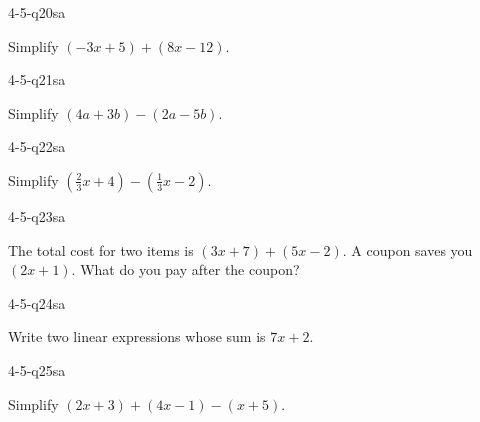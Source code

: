 \begin{practiceQuestion}{4-5-q20}{sa}
\begin{questionText}
Simplify $(-3x + 5) + (8x - 12)$.
\end{questionText}
\end{practiceQuestion}

\begin{practiceQuestion}{4-5-q21}{sa}
\begin{questionText}
Simplify $(4a + 3b) - (2a - 5b)$.
\end{questionText}
\end{practiceQuestion}

\begin{practiceQuestion}{4-5-q22}{sa}
\begin{questionText}
Simplify $(\frac{2}{3}x + 4) - (\frac{1}{3}x - 2)$.
\end{questionText}
\end{practiceQuestion}

\begin{practiceQuestion}{4-5-q23}{sa}
\begin{questionText}
The total cost for two items is $(3x + 7) + (5x - 2)$. A coupon saves you $(2x + 1)$. What do you pay after the coupon?
\end{questionText}
\end{practiceQuestion}

\begin{practiceQuestion}{4-5-q24}{sa}
\begin{questionText}
Write two linear expressions whose sum is $7x + 2$.
\end{questionText}
\end{practiceQuestion}

\begin{practiceQuestion}{4-5-q25}{sa}
\begin{questionText}
Simplify $(2x + 3) + (4x - 1) - (x + 5)$.
\end{questionText}
\end{practiceQuestion}

